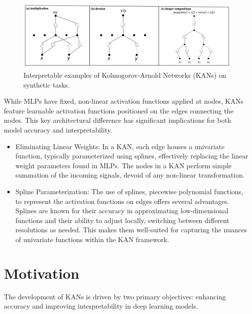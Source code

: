 \begin{figure}[t]
    \centering
    \includegraphics[width=0.9\linewidth]{Images/interpretable_examples_short.png}
    \caption{Interpretable examples of Kolmogorov-Arnold Networks (KANs) on synthetic tasks.}
    \label{fig:interpretable-examples}
\end{figure}

While MLPs have fixed, non-linear activation functions applied at nodes, KANs feature learnable activation functions positioned on the edges connecting the nodes. This key architectural difference has significant implications for both model accuracy and interpretability.
\begin{itemize}
    \item Eliminating Linear Weights: In a KAN, each edge houses a univariate function, typically parameterized using splines, effectively replacing the linear weight parameters found in MLPs. The nodes in a KAN perform simple summation of the incoming signals, devoid of any non-linear transformation.
    \item Spline Parameterization: The use of splines, piecewise polynomial functions, to represent the activation functions on edges offers several advantages. Splines are known for their accuracy in approximating low-dimensional functions and their ability to adjust locally, switching between different resolutions as needed. This makes them well-suited for capturing the nuances of univariate functions within the KAN framework.
\end{itemize}

\section{Motivation}

The development of KANs is driven by two primary objectives: enhancing accuracy and improving interpretability in deep learning models.


